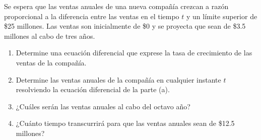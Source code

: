 \item Se espera que las ventas anuales de una nueva compañía crezcan a razón proporcional a la diferencia entre las ventas en el tiempo $t$ y un límite superior de \$25 millones. Las ventas son inicialmente de \$0 y se proyecta que sean de \$3.5 millones al cabo de tres años.
    \begin{enumerate}
        \item[(a)] Determine una ecuación diferencial que exprese la tasa de crecimiento de las ventas de la compañía.
        \item[(b)] Determine las ventas anuales de la compañía en cualquier instante $t$ resolviendo la ecuación diferencial de la parte (a).
        \item[(c)] ¿Cuáles serán las ventas anuales al cabo del octavo año?
        \item[(d)] ¿Cuánto tiempo transcurrirá para que las ventas anuales sean de \$12.5 millones?
    \end{enumerate}
